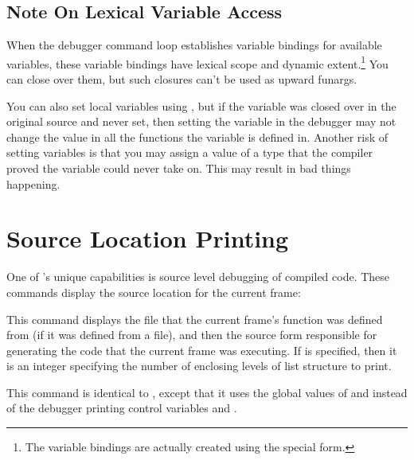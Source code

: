 \subsection{Note On Lexical Variable Access}
 
When the debugger command loop establishes variable bindings for available
variables, these variable bindings have lexical scope and dynamic
extent.\footnote{The variable bindings are actually created using the \clisp{}
 special form.}  You can close over them, but such closures
can't be used as upward funargs.

You can also set local variables using , but if the variable was closed
over in the original source and never set, then setting the variable in the
debugger may not change the value in all the functions the variable is defined
in.  Another risk of setting variables is that you may assign a value of a type
that the compiler proved the variable could never take on.  This may result in
bad things happening.


\section{Source Location Printing}
\label{source-locations}

One of \cmucl{}'s unique capabilities is source level debugging of compiled
code.  These commands display the source location for the current frame:
\begin{Lentry}

\item[\code{source} \mopt{\var{context}}]%
This command displays the file that the current frame's function was defined
from (if it was defined from a file), and then the source form responsible for
generating the code that the current frame was executing.  If  is
specified, then it is an integer specifying the number of enclosing levels of
list structure to print.

\item[\code{vsource} \mopt{\var{context}}]%
This command is identical to , except that it uses the
global values of  and  instead
of the debugger printing control variables 
and .
\end{Lentry}

